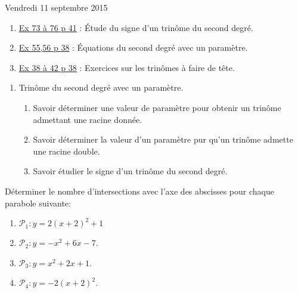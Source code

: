 \documentclass[a4paper,11pt]{article}
\theoremstyle{break}
\begin{document}
  Vendredi 11 septembre 2015
  
  \begin{enumerate}
    
    \item
    \href{https://github.com/mathlorgues/math1sd1516/blob/master/images/73-76p41.png}
    {Ex 73 à 76 p 41} : \'Etude du signe d'un trinôme du second degré.
    
    \item 
    \href{https://github.com/mathlorgues/math1sd1516/blob/master/images/55-56p38.png}
    {Ex 55,56 p 38} : \'Equations du second degré avec un paramètre.
    
    \item
    \href{https://github.com/mathlorgues/math1sd1516/blob/master/20150907/38-42p38.jpg}
    {Ex 38 à 42 p 38} : Exercices sur les trinômes à faire de tête.
    
  \end{enumerate}
  
  
  \begin{Dev}
    
    \begin{enumerate}
      \item Trinôme du second degré avec un paramètre. 
      \begin{enumerate}
	\item Savoir déterminer une valeur de paramètre pour obtenir un trinôme admettant
	une racine donnée.
	\item Savoir déterminer la valeur d'un paramètre pur qu'un trinôme admette
	une racine double.
	\item Savoir étudier le signe d'un trinôme du second degré.
      \end{enumerate}
    \end{enumerate}
    
    
    
    \vspace{0.5cm}
    
    \begin{dm}
      
      Déterminer le nombre d'intersections avec l'axe des abscisses pour chaque parabole
      suivante:
      \begin{enumerate}
	\item $\mathcal{P}_1:y=2(x+2)^2+1$
	\item $\mathcal{P}_2:y=-x^2+6x-7$.%
	\item $\mathcal{P}_3:y=x^2+2x+1$.
	\item $\mathcal{P}_4:y=-2(x+2)^2$.
      \end{enumerate} 
    \end{dm}
    
  \end{Dev}
  
\end{document}
